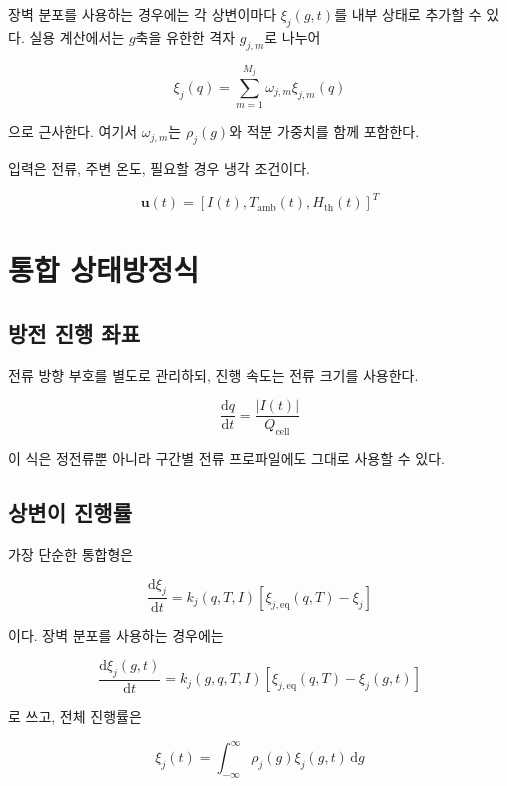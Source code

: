 \documentclass[11pt,a4paper]{article}
\newcommand{\dd}{\mathrm{d}}
\newcommand{\eq}{\mathrm{eq}}
\begin{document}
장벽 분포를 사용하는 경우에는 각 상변이마다 \(\xi_j(g,t)\)를 내부 상태로 추가할 수 있다. 실용 계산에서는 \(g\)축을 유한한 격자 \(g_{j,m}\)로 나누어

\begin{equation}
\xi_j(q)=\sum_{m=1}^{M_j}\omega_{j,m}\xi_{j,m}(q)
\label{eq:v4_xi_quad}
\end{equation}

으로 근사한다. 여기서 \(\omega_{j,m}\)는 \(\rho_j(g)\)와 적분 가중치를 함께 포함한다.

입력은 전류, 주변 온도, 필요할 경우 냉각 조건이다.

\begin{equation}
\mathbf u(t)=\left[I(t),T_{\mathrm{amb}}(t),H_{\mathrm{th}}(t)\right]^T
\label{eq:v4_input}
\end{equation}

\section{통합 상태방정식}
\subsection{방전 진행 좌표}
전류 방향 부호를 별도로 관리하되, 진행 속도는 전류 크기를 사용한다.

\begin{equation}
\frac{\dd q}{\dd t}=\frac{|I(t)|}{Q_{\mathrm{cell}}}
\label{eq:v4_state_q}
\end{equation}

이 식은 정전류뿐 아니라 구간별 전류 프로파일에도 그대로 사용할 수 있다.

\subsection{상변이 진행률}
가장 단순한 통합형은

\begin{equation}
\frac{\dd\xi_j}{\dd t}=k_j(q,T,I)\left[\xi_{j,\eq}(q,T)-\xi_j\right]
\label{eq:v4_state_xi}
\end{equation}

이다. 장벽 분포를 사용하는 경우에는

\begin{equation}
\frac{\dd\xi_j(g,t)}{\dd t}=k_j(g,q,T,I)\left[\xi_{j,\eq}(q,T)-\xi_j(g,t)\right]
\label{eq:v4_state_xig}
\end{equation}

로 쓰고, 전체 진행률은

\begin{equation}
\xi_j(t)=\int_{-\infty}^{\infty}\rho_j(g)\xi_j(g,t)\,\dd g
\label{eq:v4_state_xi_avg}
\end{equation}
\end{document}
